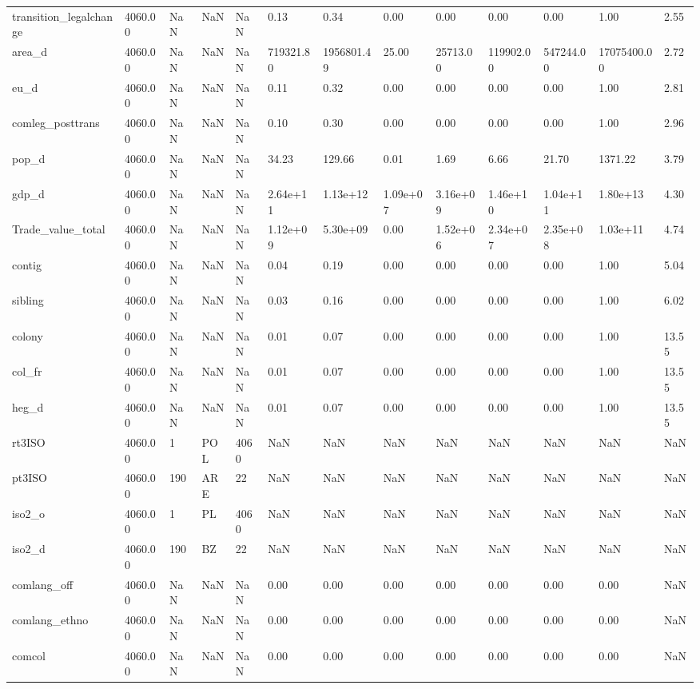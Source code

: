\documentclass{Trade_template}
\numberwithin{equation}{section}
\begin{document}
\begin{table}
{\begin{tabularx}{\textwidth}{@{} L *{12}{Y}  @{}}
transition\_legalchange & 4060.00 & NaN & NaN & NaN & 0.13 & 0.34 & 0.00 & 0.00 & 0.00 & 0.00 & 1.00 & 2.55 \\
area\_d & 4060.00 & NaN & NaN & NaN & 719321.80 & 1956801.49 & 25.00 & 25713.00 & 119902.00 & 547244.00 & 17075400.00 & 2.72 \\
eu\_d & 4060.00 & NaN & NaN & NaN & 0.11 & 0.32 & 0.00 & 0.00 & 0.00 & 0.00 & 1.00 & 2.81 \\
comleg\_posttrans & 4060.00 & NaN & NaN & NaN & 0.10 & 0.30 & 0.00 & 0.00 & 0.00 & 0.00 & 1.00 & 2.96 \\
pop\_d & 4060.00 & NaN & NaN & NaN & 34.23 & 129.66 & 0.01 & 1.69 & 6.66 & 21.70 & 1371.22 & 3.79 \\
gdp\_d & 4060.00 & NaN & NaN & NaN & 2.64e+11 & 1.13e+12 & 1.09e+07 & 3.16e+09 & 1.46e+10 & 1.04e+11 & 1.80e+13 & 4.30 \\
Trade\_value\_total & 4060.00 & NaN & NaN & NaN & 1.12e+09 & 5.30e+09 & 0.00 & 1.52e+06 & 2.34e+07 & 2.35e+08 & 1.03e+11 & 4.74 \\
contig & 4060.00 & NaN & NaN & NaN & 0.04 & 0.19 & 0.00 & 0.00 & 0.00 & 0.00 & 1.00 & 5.04 \\
sibling & 4060.00 & NaN & NaN & NaN & 0.03 & 0.16 & 0.00 & 0.00 & 0.00 & 0.00 & 1.00 & 6.02 \\
colony & 4060.00 & NaN & NaN & NaN & 0.01 & 0.07 & 0.00 & 0.00 & 0.00 & 0.00 & 1.00 & 13.55 \\
col\_fr & 4060.00 & NaN & NaN & NaN & 0.01 & 0.07 & 0.00 & 0.00 & 0.00 & 0.00 & 1.00 & 13.55 \\
heg\_d & 4060.00 & NaN & NaN & NaN & 0.01 & 0.07 & 0.00 & 0.00 & 0.00 & 0.00 & 1.00 & 13.55 \\
rt3ISO & 4060.00 & 1 & POL & 4060 & NaN & NaN & NaN & NaN & NaN & NaN & NaN & NaN \\
pt3ISO & 4060.00 & 190 & ARE & 22 & NaN & NaN & NaN & NaN & NaN & NaN & NaN & NaN \\
iso2\_o & 4060.00 & 1 & PL & 4060 & NaN & NaN & NaN & NaN & NaN & NaN & NaN & NaN \\
iso2\_d & 4060.00 & 190 & BZ & 22 & NaN & NaN & NaN & NaN & NaN & NaN & NaN & NaN \\
comlang\_off & 4060.00 & NaN & NaN & NaN & 0.00 & 0.00 & 0.00 & 0.00 & 0.00 & 0.00 & 0.00 & NaN \\
comlang\_ethno & 4060.00 & NaN & NaN & NaN & 0.00 & 0.00 & 0.00 & 0.00 & 0.00 & 0.00 & 0.00 & NaN \\
comcol & 4060.00 & NaN & NaN & NaN & 0.00 & 0.00 & 0.00 & 0.00 & 0.00 & 0.00 & 0.00 & NaN \\

\end{tabularx}}
\end{table}
\end{document}
